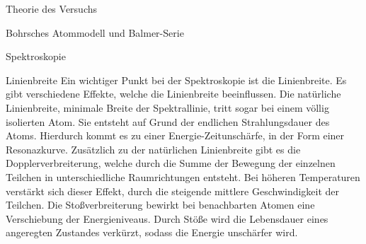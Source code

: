 \documentclass[pdftex, a4paper,11pt, twoside, ngerman]{report}
\begin{document}
\begin{chapter}{Theorie des Versuchs}
\begin{section}{Bohrsches Atommodell und Balmer-Serie}
\begin{subsection}{Spektroskopie}
        \begin{subsubsection}{Linienbreite}
          Ein wichtiger Punkt bei der Spektroskopie ist die Linienbreite. Es gibt verschiedene Effekte, welche die Linienbreite beeinflussen. Die natürliche Linienbreite, minimale Breite der Spektrallinie, tritt sogar bei einem völlig isolierten Atom. Sie entsteht auf Grund der endlichen Strahlungsdauer des Atoms. Hierdurch kommt es zu einer Energie-Zeitunschärfe, in der Form einer Resonazkurve. Zusätzlich zu der natürlichen Linienbreite gibt es die Dopplerverbreiterung, welche durch die Summe  der Bewegung der einzelnen Teilchen in unterschiedliche Raumrichtungen entsteht. Bei höheren Temperaturen verstärkt sich dieser Effekt, durch die steigende mittlere Geschwindigkeit der Teilchen. Die Stoßverbreiterung bewirkt bei benachbarten Atomen eine Verschiebung der Energieniveaus. Durch Stöße wird die Lebensdauer eines angeregten Zustandes verkürzt, sodass die Energie unschärfer wird.
        
        
        \end{subsubsection}

      \end{subsection}
      
    \end{section}

  \end{chapter}
          
          
          
\end{document}

